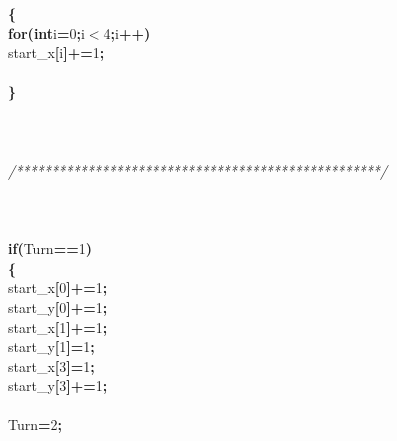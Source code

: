\documentclass[a4paper, 10pt]{article}
\newcommand\SPC{\hspace*{0.6em}}
\newcommand\HYP{\mbox{\char 45}}
\newcommand{\CppAComment}[1]{\textit{\textcolor[rgb]{0.2,0.6,1}{#1}}}
\newcommand{\CppAIdentifier}[1]{#1}
\newcommand{\CppANumber}[1]{\textcolor[rgb]{0.5,0,0.5}{#1}}
\newcommand{\CppAReservedWord}[1]{\textbf{#1}}
\newcommand{\CppASpace}[1]{\colorbox[rgb]{1,1,1}{#1}}
\newcommand{\CppASymbol}[1]{\textbf{\textcolor[rgb]{1,0,0}{#1}}}
\begin{document}
\begin{ttfamily}
\CppASpace{\SPC \SPC \SPC \SPC }\CppASymbol{\{}\\
\CppASpace{\SPC \SPC \SPC \SPC \SPC }\CppAReservedWord{for}\CppASymbol{(}\CppAReservedWord{int}\CppASpace{\SPC }\CppAIdentifier{i}\CppASymbol{=}\CppANumber{0}\CppASymbol{;}\CppAIdentifier{i}\CppASymbol{$<$}\CppANumber{4}\CppASymbol{;}\CppAIdentifier{i}\CppASymbol{++}\CppASymbol{)}\\
\CppASpace{\SPC \SPC \SPC \SPC \SPC \SPC }\CppAIdentifier{start\_x}\CppASymbol{[}\CppAIdentifier{i}\CppASymbol{]}\CppASymbol{+=}\CppANumber{1}\CppASymbol{;}\\
\\
\CppASpace{\SPC \SPC \SPC \SPC }\CppASymbol{\}}\\
\\
\\
\\
\CppASpace{\SPC \SPC \SPC }\CppAComment{/***************************************************/}\\
\\
\\
\\
\CppASpace{\SPC \SPC \SPC \SPC }\CppAReservedWord{if}\CppASymbol{(}\CppAIdentifier{Turn}\CppASymbol{==}\CppANumber{1}\CppASymbol{)}\\
\CppASpace{\SPC \SPC \SPC \SPC }\CppASymbol{\{}\\
\CppASpace{\SPC \SPC \SPC \SPC \SPC }\CppAIdentifier{start\_x}\CppASymbol{[}\CppANumber{0}\CppASymbol{]}\CppASymbol{+=}\CppANumber{1}\CppASymbol{;}\\
\CppASpace{\SPC \SPC \SPC \SPC \SPC }\CppAIdentifier{start\_y}\CppASymbol{[}\CppANumber{0}\CppASymbol{]}\CppASymbol{+=}\CppANumber{1}\CppASymbol{;}\\
\CppASpace{\SPC \SPC \SPC \SPC \SPC }\CppAIdentifier{start\_x}\CppASymbol{[}\CppANumber{1}\CppASymbol{]}\CppASymbol{+=}\CppANumber{1}\CppASymbol{;}\\
\CppASpace{\SPC \SPC \SPC \SPC \SPC }\CppAIdentifier{start\_y}\CppASymbol{[}\CppANumber{1}\CppASymbol{]}\CppASymbol{\HYP =}\CppANumber{1}\CppASymbol{;}\\
\CppASpace{\SPC \SPC \SPC \SPC \SPC }\CppAIdentifier{start\_x}\CppASymbol{[}\CppANumber{3}\CppASymbol{]}\CppASymbol{\HYP =}\CppANumber{1}\CppASymbol{;}\\
\CppASpace{\SPC \SPC \SPC \SPC \SPC }\CppAIdentifier{start\_y}\CppASymbol{[}\CppANumber{3}\CppASymbol{]}\CppASymbol{+=}\CppANumber{1}\CppASymbol{;}\\
\\
\CppASpace{\SPC \SPC \SPC \SPC \SPC }\CppAIdentifier{Turn}\CppASymbol{=}\CppANumber{2}\CppASymbol{;}\\

\end{ttfamily}
\end{document}
